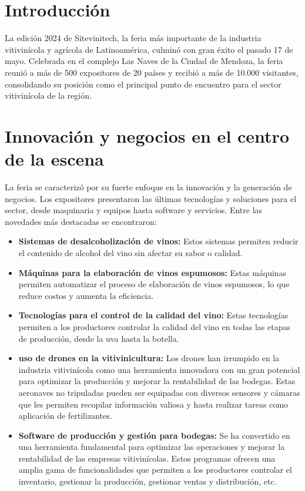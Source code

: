 \section{Introducción}

\noindent La edición 2024 de Sitevinitech, la feria más importante de la industria vitivinícola y agrícola de Latinoamérica, culminó con gran éxito el pasado 17 de mayo. Celebrada en el complejo Las Naves de la Ciudad de Mendoza, la feria reunió a más de 500 expositores de 20 países y recibió a más de 10.000 visitantes, consolidando su posición como el principal punto de encuentro para el sector vitivinícola de la región.

\section{Innovación y negocios en el centro de la escena}

La feria se caracterizó por su fuerte enfoque en la innovación y la generación de negocios. Los expositores presentaron las últimas tecnologías y soluciones para el sector, desde maquinaria y equipos hasta software y servicios. Entre las novedades más destacadas se encontraron:

\begin{itemize}
    \item \textbf{Sistemas de desalcoholización de vinos:} Estos sistemas permiten reducir el contenido de alcohol del vino sin afectar su sabor o calidad.
    \item \textbf{Máquinas para la elaboración de vinos espumosos:} Estas máquinas permiten automatizar el proceso de elaboración de vinos espumosos, lo que reduce costos y aumenta la eficiencia.
     \item \textbf{Tecnologías para el control de la calidad del vino:} Estas tecnologías permiten a los productores controlar la calidad del vino en todas las etapas de producción, desde la uva hasta la botella.
     \item \textbf{uso de drones en la vitivinicultura:} Los drones han irrumpido en la industria vitivinícola como una herramienta innovadora con un gran potencial para optimizar la producción y mejorar la rentabilidad de las bodegas. Estas aeronaves no tripuladas pueden ser equipadas con diversos sensores y cámaras que les permiten recopilar información valiosa y hasta realizar tareas como aplicación de fertilizantes.
    \item \textbf{Software de producción y gestión para bodegas:} Se ha convertido en una herramienta fundamental para optimizar las operaciones y mejorar la rentabilidad de las empresas vitivinícolas. Estos programas ofrecen una amplia gama de funcionalidades que permiten a los productores controlar el inventario, gestionar la producción, gestionar ventas y distribución, etc.
\end{itemize}
 
